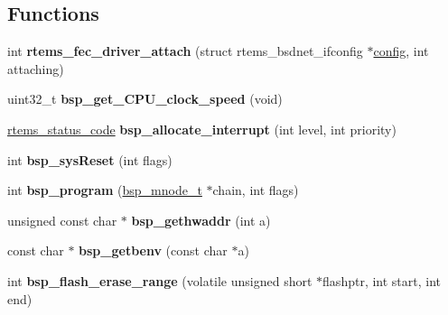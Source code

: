 \subsection*{Functions}
\begin{DoxyCompactItemize}
\item 
\mbox{\label{group__RTEMSBSPsM68kUC5282_ga584ad500075555d3cd0a4f895d73df04}} 
int {\bfseries rtems\+\_\+fec\+\_\+driver\+\_\+attach} (struct rtems\+\_\+bsdnet\+\_\+ifconfig $\ast$\mbox{\hyperlink{structconfig__s}{config}}, int attaching)
\item 
\mbox{\label{group__RTEMSBSPsM68kUC5282_gaf40918e55ef318de160e2e3174ba5562}} 
uint32\+\_\+t {\bfseries bsp\+\_\+get\+\_\+\+C\+P\+U\+\_\+clock\+\_\+speed} (void)
\item 
\mbox{\label{group__RTEMSBSPsM68kUC5282_ga3ee2627f99c774fb2f2ce96fb017d14e}} 
\mbox{\hyperlink{group__ClassicStatus_ga545d41846817eaba6143d52ee4d9e9fe}{rtems\+\_\+status\+\_\+code}} {\bfseries bsp\+\_\+allocate\+\_\+interrupt} (int level, int priority)
\item 
\mbox{\label{group__RTEMSBSPsM68kUC5282_gaa1aee8f1e3e4f51db80b23d04a41b005}} 
int {\bfseries bsp\+\_\+sys\+Reset} (int flags)
\item 
\mbox{\label{group__RTEMSBSPsM68kUC5282_ga89b6ad701319fcbf7ed0b125f082e9b1}} 
int {\bfseries bsp\+\_\+program} (\mbox{\hyperlink{structbsp__mnode__t}{bsp\+\_\+mnode\+\_\+t}} $\ast$chain, int flags)
\item 
\mbox{\label{group__RTEMSBSPsM68kUC5282_ga4f2e49fdc5267e6266c8cb960b8a52b9}} 
unsigned const char $\ast$ {\bfseries bsp\+\_\+gethwaddr} (int a)
\item 
\mbox{\label{group__RTEMSBSPsM68kUC5282_ga57e19f5f190bc53e6c355d0b6697ff88}} 
const char $\ast$ {\bfseries bsp\+\_\+getbenv} (const char $\ast$a)
\item 
\mbox{\label{group__RTEMSBSPsM68kUC5282_gaae1b1be563a29e862e1a24616a7e413e}} 
int {\bfseries bsp\+\_\+flash\+\_\+erase\+\_\+range} (volatile unsigned short $\ast$flashptr, int start, int end)

\end{DoxyCompactItemize}
